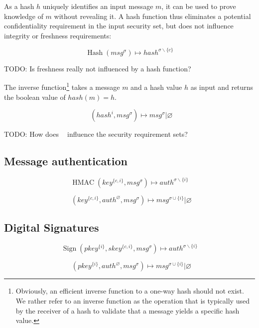 \documentclass[a4paper]{article}
\DeclareMathOperator{\hash}{Hash}
\DeclareMathOperator{\hashvrfy}{Verify_{Hash}}
\DeclareMathOperator{\hmac}{HMAC}
\DeclareMathOperator{\hmacvrfy}{Verify_{HMAC}}
\DeclareMathOperator{\sign}{Sign}
\DeclareMathOperator{\signvrfy}{Verify_{Sig}}
\newcommand{\TODO}[1]{\small\noindent\color{red} TODO: #1\color{black}}
\newcommand{\emptysec}{\varnothing}
\newcommand{\secminus}{\smallsetminus}
\begin{document}
As a hash $h$ uniquely identifies an input message $m$, it can be used to prove
knowledge of $m$ without revealing it. A hash function thus eliminates a
potential confidentiality requirement in the input security set, but does not
influence integrity or freshness requirements:

$$\hash(msg^\sigma) \mapsto hash^{\sigma\secminus\{c\}}$$

\TODO{Is freshness really not influenced by a hash function?}

The inverse function\footnote{Obviously, an efficient inverse function to a
one-way hash should not exist. We rather refer to an inverse function as the
operation that is typically used by the receiver of a hash to validate that a
message yields a specific hash value.} takes a message $m$ and a hash
value $h$ as input and returns the boolean value of $hash(m) = h$.

$$\hashvrfy(hash^{i}, msg^\sigma) \mapsto msg^{\sigma} | \emptysec$$

\TODO{How does $\hashvrfy$ influence the security requirement sets?}

\subsection{Message authentication}

$$\hmac(key^{\{c,i\}}, msg^\sigma) \mapsto auth^{\sigma\secminus{\{i\}}}$$

$$\hmacvrfy(key^{\{c,i\}}, auth^\emptysec, msg^\sigma) \mapsto msg^{\sigma\cup\{i\}} | \emptysec$$

%

\subsection{Digital Signatures}

$$\sign(pkey^{\{i\}}, skey^{\{c,i\}}, msg^\sigma) \mapsto auth^{\sigma\secminus\{i\}}$$

$$\signvrfy(pkey^{\{i\}}, auth^{\emptysec}, msg^\sigma) \mapsto msg^{\sigma\cup\{i\}} | \emptysec$$
\end{document}
